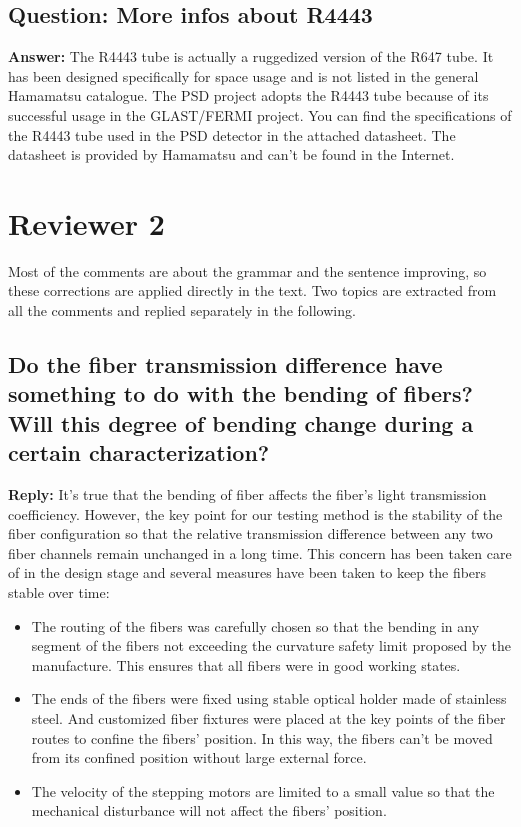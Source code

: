 \documentclass[]{article}
\begin{document}
\subsection{Question: More infos about R4443}

\textbf{Answer:}\newline
The R4443 tube is actually a ruggedized version of the R647 tube. It has been designed specifically for space usage and is not listed in the general Hamamatsu catalogue. The PSD project adopts the R4443 tube because of its successful usage in the GLAST/FERMI project. You can find the specifications of the R4443 tube used in the PSD detector in the attached datasheet. The datasheet is provided by  Hamamatsu and can't be found in the Internet. 

\section{Reviewer 2}

Most of the comments are about the grammar and the sentence improving, so these corrections are applied directly in the text.
Two topics are extracted from all the comments and replied separately in the following.

\subsection{Do the fiber transmission difference have something to do with the bending of fibers?
Will this degree of bending change during a certain characterization?}

\textbf{Reply:}\newline
It's true that the bending of fiber affects the fiber's light transmission coefficiency. However, the key point for our testing method is the stability of the fiber configuration so that the relative transmission difference between any two fiber channels remain unchanged in a long time. This concern has been taken care of in the design stage and several measures have been taken to keep the fibers stable over time:
\begin{itemize}
	\item The routing of the fibers was carefully chosen so that the bending in any segment of the fibers not exceeding the curvature safety limit proposed by the manufacture. This ensures that all fibers were in good working states.
	\item The ends of the fibers were fixed using stable optical holder made of stainless steel. And customized fiber fixtures were placed at the key points of the fiber routes to confine the fibers' position. In this way, the fibers can't be moved from its confined position without large external force.
	\item The velocity of the stepping motors are limited to a small value so that the mechanical disturbance will not affect the fibers' position.
\end{itemize}
\end{document}
